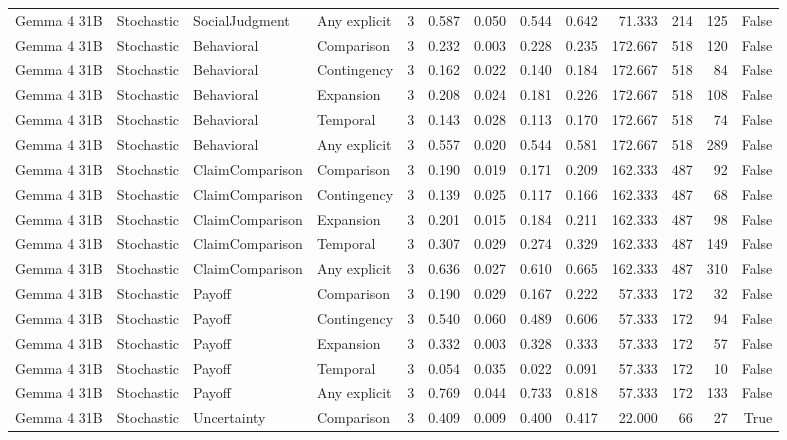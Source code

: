 \begin{tabular}{llllrrrrrrrrr}
Gemma 4 31B & Stochastic & SocialJudgment & Any explicit & 3 & 0.587 & 0.050 & 0.544 & 0.642 & 71.333 & 214 & 125 & False \\
Gemma 4 31B & Stochastic & Behavioral & Comparison & 3 & 0.232 & 0.003 & 0.228 & 0.235 & 172.667 & 518 & 120 & False \\
Gemma 4 31B & Stochastic & Behavioral & Contingency & 3 & 0.162 & 0.022 & 0.140 & 0.184 & 172.667 & 518 & 84 & False \\
Gemma 4 31B & Stochastic & Behavioral & Expansion & 3 & 0.208 & 0.024 & 0.181 & 0.226 & 172.667 & 518 & 108 & False \\
Gemma 4 31B & Stochastic & Behavioral & Temporal & 3 & 0.143 & 0.028 & 0.113 & 0.170 & 172.667 & 518 & 74 & False \\
Gemma 4 31B & Stochastic & Behavioral & Any explicit & 3 & 0.557 & 0.020 & 0.544 & 0.581 & 172.667 & 518 & 289 & False \\
Gemma 4 31B & Stochastic & ClaimComparison & Comparison & 3 & 0.190 & 0.019 & 0.171 & 0.209 & 162.333 & 487 & 92 & False \\
Gemma 4 31B & Stochastic & ClaimComparison & Contingency & 3 & 0.139 & 0.025 & 0.117 & 0.166 & 162.333 & 487 & 68 & False \\
Gemma 4 31B & Stochastic & ClaimComparison & Expansion & 3 & 0.201 & 0.015 & 0.184 & 0.211 & 162.333 & 487 & 98 & False \\
Gemma 4 31B & Stochastic & ClaimComparison & Temporal & 3 & 0.307 & 0.029 & 0.274 & 0.329 & 162.333 & 487 & 149 & False \\
Gemma 4 31B & Stochastic & ClaimComparison & Any explicit & 3 & 0.636 & 0.027 & 0.610 & 0.665 & 162.333 & 487 & 310 & False \\
Gemma 4 31B & Stochastic & Payoff & Comparison & 3 & 0.190 & 0.029 & 0.167 & 0.222 & 57.333 & 172 & 32 & False \\
Gemma 4 31B & Stochastic & Payoff & Contingency & 3 & 0.540 & 0.060 & 0.489 & 0.606 & 57.333 & 172 & 94 & False \\
Gemma 4 31B & Stochastic & Payoff & Expansion & 3 & 0.332 & 0.003 & 0.328 & 0.333 & 57.333 & 172 & 57 & False \\
Gemma 4 31B & Stochastic & Payoff & Temporal & 3 & 0.054 & 0.035 & 0.022 & 0.091 & 57.333 & 172 & 10 & False \\
Gemma 4 31B & Stochastic & Payoff & Any explicit & 3 & 0.769 & 0.044 & 0.733 & 0.818 & 57.333 & 172 & 133 & False \\
Gemma 4 31B & Stochastic & Uncertainty & Comparison & 3 & 0.409 & 0.009 & 0.400 & 0.417 & 22.000 & 66 & 27 & True \\

\end{tabular}
